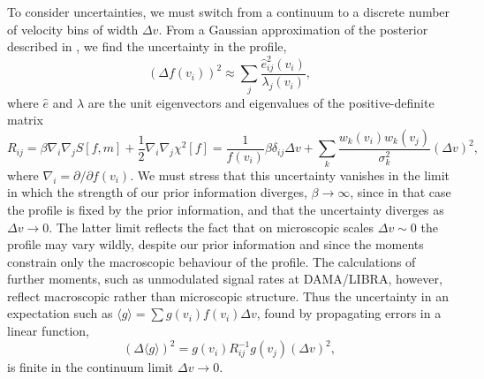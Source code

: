 \documentclass{article}
\begin{document}
To consider uncertainties, we must switch from a continuum to a discrete number of velocity bins of width $\Delta v$. From a Gaussian approximation of the posterior described in , we find the uncertainty in the profile,
\begin{equation}\label{eq:error_pdf}
(\Delta f(v_i))^2 \approx \sum_j \frac{\hat e_{ij}^2(v_i)}{\lambda_j(v_i)},
\end{equation}
where $\hat e$ and $\lambda$ are the unit eigenvectors and eigenvalues of the positive-definite matrix
\begin{equation}
R_{ij} = \beta \nabla_i\nabla_j S[f, m] + \frac12 \nabla_i\nabla_j \chi^2[f] = \frac{1}{f(v_i)} \beta\delta_{ij} \Delta v + \sum_k \frac{w_k(v_i) w_k(v_j)}{\sigma_k^2} (\Delta v)^2,
\end{equation}
where $\nabla_i = \partial / \partial f(v_i)$. We must stress that this uncertainty vanishes in the limit in which the strength of our prior information diverges, $\beta \to \infty$, since in that case the profile is fixed by the prior information, and that the uncertainty diverges as $\Delta v \to 0$. The latter limit reflects the fact that on microscopic scales $\Delta v \sim 0$ the profile may vary wildly, despite our prior information and since the moments constrain only the macroscopic behaviour of the profile. The calculations of further moments, such as unmodulated signal rates at DAMA/LIBRA, however, reflect macroscopic rather than microscopic structure\cite{gull1999quantified}. Thus the uncertainty in an expectation such as $\langle g \rangle = \sum g(v_i) f(v_i) \Delta v$, found by propagating errors in a linear function,
\begin{equation}\label{eq:error}
(\Delta \langle g \rangle)^2 = g(v_i) R_{ij}^{-1} g(v_j) (\Delta v)^2,
\end{equation}
is finite in the continuum limit $\Delta v \to 0$. 
\end{document}
